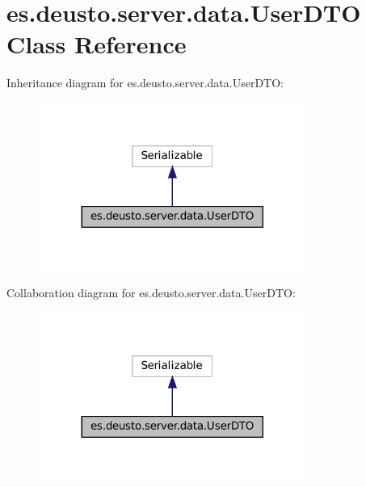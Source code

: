 \hypertarget{classes_1_1deusto_1_1server_1_1data_1_1_user_d_t_o}{}\section{es.\+deusto.\+server.\+data.\+User\+D\+TO Class Reference}
\label{classes_1_1deusto_1_1server_1_1data_1_1_user_d_t_o}


Inheritance diagram for es.\+deusto.\+server.\+data.\+User\+D\+TO\+:
\nopagebreak
\begin{figure}[H]
\begin{center}
\leavevmode
\includegraphics[width=248pt]{classes_1_1deusto_1_1server_1_1data_1_1_user_d_t_o__inherit__graph}
\end{center}
\end{figure}


Collaboration diagram for es.\+deusto.\+server.\+data.\+User\+D\+TO\+:
\nopagebreak
\begin{figure}[H]
\begin{center}
\leavevmode
\includegraphics[width=248pt]{classes_1_1deusto_1_1server_1_1data_1_1_user_d_t_o__coll__graph}
\end{center}
\end{figure}
